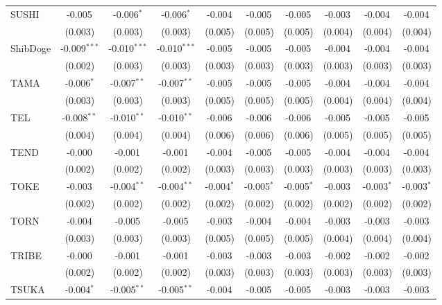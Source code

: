 \begin{table}[!htbp]
\begin{tabular}{@{\extracolsep{5pt}}lccccccccc}
 SUSHI & -0.005$^{}$ & -0.006$^{*}$ & -0.006$^{*}$ & -0.004$^{}$ & -0.005$^{}$ & -0.005$^{}$ & -0.003$^{}$ & -0.004$^{}$ & -0.004$^{}$ \\
  & (0.003) & (0.003) & (0.003) & (0.005) & (0.005) & (0.005) & (0.004) & (0.004) & (0.004) \\
 ShibDoge & -0.009$^{***}$ & -0.010$^{***}$ & -0.010$^{***}$ & -0.005$^{}$ & -0.005$^{}$ & -0.005$^{}$ & -0.004$^{}$ & -0.004$^{}$ & -0.004$^{}$ \\
  & (0.002) & (0.003) & (0.003) & (0.003) & (0.003) & (0.003) & (0.003) & (0.003) & (0.003) \\
 TAMA & -0.006$^{*}$ & -0.007$^{**}$ & -0.007$^{**}$ & -0.005$^{}$ & -0.005$^{}$ & -0.005$^{}$ & -0.004$^{}$ & -0.004$^{}$ & -0.004$^{}$ \\
  & (0.003) & (0.003) & (0.003) & (0.005) & (0.005) & (0.005) & (0.004) & (0.004) & (0.004) \\
 TEL & -0.008$^{**}$ & -0.010$^{**}$ & -0.010$^{**}$ & -0.006$^{}$ & -0.006$^{}$ & -0.006$^{}$ & -0.005$^{}$ & -0.005$^{}$ & -0.005$^{}$ \\
  & (0.004) & (0.004) & (0.004) & (0.006) & (0.006) & (0.006) & (0.005) & (0.005) & (0.005) \\
 TEND & -0.000$^{}$ & -0.001$^{}$ & -0.001$^{}$ & -0.004$^{}$ & -0.005$^{}$ & -0.005$^{}$ & -0.004$^{}$ & -0.004$^{}$ & -0.004$^{}$ \\
  & (0.002) & (0.002) & (0.002) & (0.003) & (0.003) & (0.003) & (0.003) & (0.003) & (0.003) \\
 TOKE & -0.003$^{}$ & -0.004$^{**}$ & -0.004$^{**}$ & -0.004$^{*}$ & -0.005$^{*}$ & -0.005$^{*}$ & -0.003$^{}$ & -0.003$^{*}$ & -0.003$^{*}$ \\
  & (0.002) & (0.002) & (0.002) & (0.002) & (0.002) & (0.002) & (0.002) & (0.002) & (0.002) \\
 TORN & -0.004$^{}$ & -0.005$^{}$ & -0.005$^{}$ & -0.003$^{}$ & -0.004$^{}$ & -0.004$^{}$ & -0.003$^{}$ & -0.003$^{}$ & -0.003$^{}$ \\
  & (0.003) & (0.003) & (0.003) & (0.005) & (0.005) & (0.005) & (0.004) & (0.004) & (0.004) \\
 TRIBE & -0.000$^{}$ & -0.001$^{}$ & -0.001$^{}$ & -0.003$^{}$ & -0.003$^{}$ & -0.003$^{}$ & -0.002$^{}$ & -0.002$^{}$ & -0.002$^{}$ \\
  & (0.002) & (0.002) & (0.002) & (0.003) & (0.003) & (0.003) & (0.003) & (0.003) & (0.003) \\
 TSUKA & -0.004$^{*}$ & -0.005$^{**}$ & -0.005$^{**}$ & -0.004$^{}$ & -0.005$^{}$ & -0.005$^{}$ & -0.003$^{}$ & -0.003$^{}$ & -0.003$^{}$ \\

\end{tabular}
\end{table}
